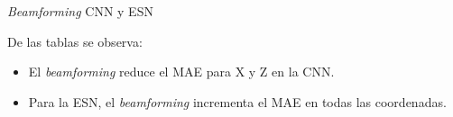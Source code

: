 \documentclass[aspectratio=169]{beamer}
\begin{document}
\begin{frame}{\textit{Beamforming} CNN y ESN}

    \vspace*{-1cm}

    \begin{table}[htbp]
\centering
\caption{\tiny Error absoluto medio en las coordenadas X, Y y Z para CNN con y sin \textit{beamforming} (media $\pm$ desviación estándar)}
\label{tab:CNNmae_summary_all_models}
{\tiny
\setlength{\tabcolsep}{4pt}
}
\end{table}

    \vspace*{-0.5cm}

    \begin{table}[htbp]
\centering
\caption{\tiny Error absoluto medio en las coordenadas X, Y y Z para ESN con y sin \textit{beamforming} (media $\pm$ desviación estándar)}
\label{tab:ESNmae_summary_all_models}
{\tiny
\setlength{\tabcolsep}{4pt}
}
\end{table}
\vspace*{0.3cm}
\scriptsize
De las tablas se observa:

        \begin{itemize}
            \item El \textit{beamforming} reduce el MAE para X y Z en la CNN.
            \item Para la ESN, el \textit{beamforming} incrementa el MAE en todas las coordenadas.
        \end{itemize}

\end{frame}
\end{document}
